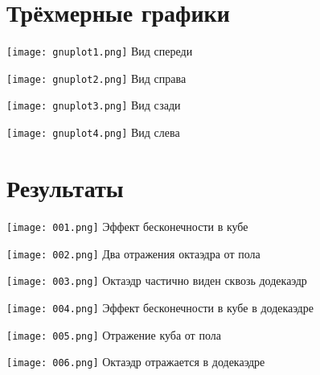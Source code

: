 \section{Трёхмерные графики}
\begin{center}
\texttt{[image: gnuplot1.png]}\newline\noindent
Вид спереди
\end{center}
\pagebreak
\begin{center}
\texttt{[image: gnuplot2.png]}\newline\noindent
Вид справа
\end{center}
\pagebreak
\begin{center}
\texttt{[image: gnuplot3.png]}\newline\noindent
Вид сзади
\end{center}
\pagebreak
\begin{center}
\texttt{[image: gnuplot4.png]}\newline\noindent
Вид слева
\end{center}
\pagebreak

\section{Результаты}
\begin{center}
\texttt{[image: 001.png]}\newline\noindent
Эффект бесконечности в кубе
\end{center}
\begin{center}
\texttt{[image: 002.png]}\newline\noindent
Два отражения октаэдра от пола
\end{center}
\pagebreak

\begin{center}
\texttt{[image: 003.png]}\newline\noindent
Октаэдр частично виден сквозь додекаэдр
\end{center}
\begin{center}
\texttt{[image: 004.png]}\newline\noindent
Эффект бесконечности в кубе в додекаэдре
\end{center}
\pagebreak

\begin{center}
\texttt{[image: 005.png]}\newline\noindent
Отражение куба от пола
\end{center}
\begin{center}
\texttt{[image: 006.png]}\newline\noindent
Октаэдр отражается в додекаэдре
\end{center}
\pagebreak

